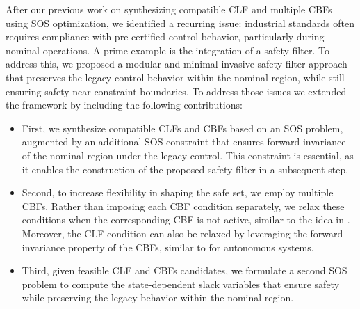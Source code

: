 \documentclass[lettersize,journal]{IEEEtran}
\newcommand{\afterReviewChangedBox}[1]{{\color{orange}#1}}
\begin{document}
\afterReviewChangedBox{After our previous work \cite{schneeberger2023sos} on synthesizing compatible CLF and multiple CBFs using SOS optimization, 
we identified a recurring issue: industrial standards often requires compliance with pre-certified control behavior, particularly during nominal operations.
A prime example is the integration of a safety filter.
To address this, we proposed a modular and minimal invasive safety filter approach that preserves the legacy control behavior within the nominal region, while still ensuring safety near constraint boundaries.
To address those issues we extended the framework by including the following contributions:}
\begin{itemize}
   \item \afterReviewChangedBox{First, we synthesize compatible CLFs and CBFs based on an SOS problem, augmented by an additional SOS constraint that ensures forward-invariance of the nominal region under the legacy control.
   This constraint is essential, as it enables the construction of the proposed safety filter in a subsequent step.}
   \item Second, to increase flexibility in shaping the safe set, we employ multiple CBFs.
   Rather than imposing each CBF condition separately, we relax these conditions when the corresponding CBF is not active, similar to the idea in \cite{IsalyGhanbarpour:22}.
   Moreover, the CLF condition can also be relaxed by leveraging the forward invariance property of the CBFs, similar to \cite{valmorbida2017region} for autonomous systems.
   \item \afterReviewChangedBox{Third, given feasible CLF and CBFs candidates, we formulate a second SOS problem to compute the state-dependent slack variables that ensure safety while preserving the legacy behavior within the nominal region.}
\end{itemize}
\end{document}
